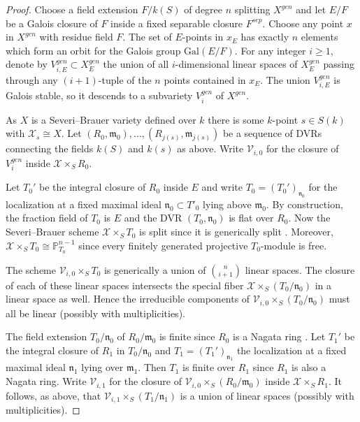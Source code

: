 \documentclass[12pt]{amsart}
\theoremstyle{definition}
\begin{document}
\begin{proof}
Choose a field extension $F/k(S)$ of degree $n$ splitting $X^{gen}$ and let $E/F$ be a Galois closure of $F$ inside a fixed separable closure $F^{sep}$. 
Choose any point $x$ in $X^{gen}$ with residue field $F$. The set of $E$-points in $x_E$ has exactly $n$ elements which form an orbit for the Galois group $\mathrm{Gal}(E/F)$. For any integer $i\geq 1$, denote by $V^{gen}_{i,E}\subset X^{gen}_E$ the union of all $i$-dimensional linear spaces of $X^{gen}_E$ passing through any $(i+1)$-tuple of the $n$ points contained in $x_E$. The union $V^{gen}_{i,E}$ is Galois stable, so it descends to a subvariety $V^{gen}_i$ of $X^{gen}$.

As $X$ is a Severi--Brauer variety defined over $k$ there is some $k$-point $s\in S(k)$ with $\mathcal{X}_s\cong X$. Let $(R_0,\mathfrak{m}_0),..., (R_{j(s)},\mathfrak{m}_{j(s)})$ be a sequence of DVRs connecting the fields $k(S)$ and $k(s)$ as above. Write $\mathcal{V}_{i,0}$ for the closure of $V_i^{gen}$ inside $\mathcal{X}\times_S R_0$.

Let $T_0'$ be the integral closure of $R_0$ inside $E$ and write $T_0=(T_0')_{\mathfrak{n}_0}$ for the localization at a fixed maximal ideal $\mathfrak{n}_0\subset T'_0$ lying above $\mathfrak{m}_0$. By construction, the fraction field of $T_0$ is $E$ and the DVR $(T_0,\mathfrak{n}_0)$ is flat over $R_0$. Now the Severi--Brauer scheme $\mathcal{X}\times_S T_0$ is split since it is generically split \cite[Lemma A.1]{em}. Moreover, $\mathcal{X}\times_S T_0\cong \mathbb{P}^{n-1}_{T_0}$ since every finitely generated projective $T_0$-module is free.

The scheme $\mathcal{V}_{i,0}\times_S T_0$ is generically a union of $\binom{n}{i+1}$ linear spaces. The closure of each of these linear spaces intersects the special fiber $\mathcal{X}\times_S (T_0/\mathfrak{n}_0)$ in a linear space as well. Hence the irreducible components of $\mathcal{V}_{i,0}\times_S (T_0/\mathfrak{n}_0)$ must all be linear (possibly with multiplicities).

The field extension $T_0/\mathfrak{n}_0$ of $R_0/\mathfrak{m}_0$ is finite since $R_0$ is a Nagata ring \cite[\href{https://stacks.math.columbia.edu/tag/0335}{Tag 0335}]{stacks-project}. Let $T_1'$ be the integral closure of $R_1$ in $T_0/\mathfrak{n}_0$ and $T_1=(T_1')_{\mathfrak{n}_1}$ the localization at a fixed maximal ideal $\mathfrak{n}_1$ lying over $\mathfrak{m}_1$. Then $T_1$ is finite over $R_1$ since $R_1$ is also a Nagata ring. Write $\mathcal{V}_{i,1}$ for the closure of $\mathcal{V}_{i,0}\times_S (R_0/\mathfrak{m}_0)$ inside $\mathcal{X}\times_S R_1$. It follows, as above, that $\mathcal{V}_{i,1}\times_S (T_1/\mathfrak{n}_1)$ is a union of linear spaces (possibly with multiplicities).


\end{proof}
\end{document}
